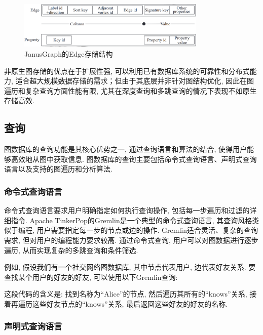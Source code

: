 \begin{figure}[H]
	\centering
	\includegraphics[width=0.8\textwidth]{images/13.png}
	\caption{JanusGraph的Edge存储结构}
	\label{fig:janusgraph-edge}
\end{figure}

非原生图存储的优点在于扩展性强, 可以利用已有数据库系统的可靠性和分布式能力, 适合超大规模数据存储的需求；但由于其底层并非针对图结构优化, 因此在图遍历和复杂查询方面性能有限, 尤其在深度查询和多跳查询的情况下表现不如原生存储高效.

\vspace{1cm}
\subsection{查询}

图数据库的查询功能是其核心优势之一, 通过查询语言和算法的结合, 使得用户能够高效地从图中获取信息. 图数据库的查询主要包括命令式查询语言、声明式查询语言以及支持的图遍历和分析算法.

\subsubsection*{命令式查询语言}

命令式查询语言要求用户明确指定如何执行查询操作, 包括每一步遍历和过滤的详细指令. Apache TinkerPop的Gremlin是一个典型的命令式查询语言, 其查询风格类似于编程, 用户需要指定每一步的节点或边的操作. Gremlin适合灵活、复杂的查询需求, 但对用户的编程能力要求较高. 通过命令式查询, 用户可以对图数据进行逐步遍历, 从而实现复杂的多跳查询和条件筛选.

例如, 假设我们有一个社交网络图数据库, 其中节点代表用户, 边代表好友关系. 要查找某个用户的好友的好友, 可以使用以下Gremlin查询:


这段代码的含义是: 找到名称为“Alice”的节点, 然后遍历其所有的“knows”关系, 接着再遍历这些好友节点的“knows”关系, 最后返回这些好友的好友的名称.

\vspace{1cm}
\subsubsection*{声明式查询语言}


